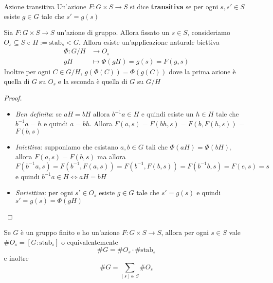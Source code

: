 \begin{definition}{Azione transitiva}
    Un'azione \(F : G \times S \to S \) si dice \textbf{transitiva} se per ogni
    \(s, s' \in S\) esiste \(g \in G\) tale che \(s' = g{(s)}\)
\end{definition}

\begin{proposition}
    Sia \(F : G \times  S \to S\) un'azione di gruppo. Allora fissato un \(s \in
    S\), consideriamo \(O_s \subseteq   S\) e \(H := \mathrm{stab}_s < G\). Allora esiste
    un'applicazione naturale biettiva
    \begin{align*}
        \Phi: G / H &\longrightarrow O_s \\
        gH &\longmapsto \Phi(gH) = g{(s)} = F(g, s)
    \end{align*}
    Inoltre per ogni \(C \in G / H\), \(g{(\Phi{(C)})} = \Phi{(g{(C)})}\) dove
    la prima azione è quella di \(G\) su \(O_s\) e la seconda è quella di \(G\)
    su \(G / H\)
\end{proposition}
\begin{proof} \(\) 
    \begin{itemize}[label = --]
        \item \emph{Ben definita}: se \(aH = bH\) allora \(b^{-1}a \in H\) e
            quindi esiste un \(h \in H\) tale che \(b^{-1}a = h\) e quindi \(a =
            bh\). Allora \(F{(a, s)} = F{(bh, s)} = F{(b, F{(h, s)})}\) =
            \(F{(b, s)}\) 
        \item \emph{Iniettiva}: supponiamo che esistano \(a, b \in G\) tali che
            \(\Phi{(aH)} = \Phi{(bH)}\), allora \(F{(a, s)} = F{(b, s)}\) ma
            allora
            \[
                F{(b^{-1}a, s)} = F{(b^{-1}, F{(a, s)})} = F{(b^{-1}, F{(b,
                s)})} = F{(b^{-1}b, s)} = F{(e, s)} = s
            \]
            e quindi \(b^{-1}a \in H \iff aH = bH\) 
        \item \emph{Suriettiva}: per ogni \(s' \in O_s\) esiste \(g \in G\) tale
            che \(s' = g{(s)}\) e quindi \(s' = g{(s)} = \Phi(gH)\)
    \end{itemize}
\end{proof}
\begin{corollary}
    Se \(G\) è un gruppo finito e ho un'azione \(F : G \times S \to S\), allora
    per ogni \(s \in S\) vale \(\# O_s = [G : \text{stab}_s]\) o
    equivalentemente
    \[
        \# G = \# O_s \cdot \# \mathrm{stab}_s
    \]
    e inoltre
    \[
        \# G = \sum_{[s] \in S} \# O_s
    \]
\end{corollary}
